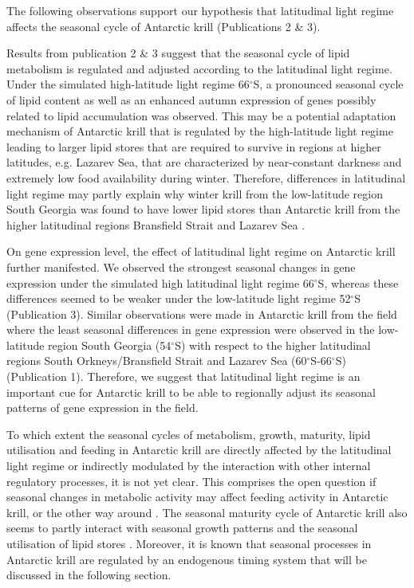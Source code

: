 The following observations support our hypothesis that latitudinal light regime
affects the seasonal cycle of Antarctic krill (Publications 2 \& 3). 

Results from publication 2 \& 3 suggest that the seasonal cycle of lipid
metabolism is regulated and adjusted according to the latitudinal light regime.
Under the simulated high-latitude light regime 66$^{\circ}$S, a pronounced
seasonal cycle of lipid content as well as an enhanced autumn expression of
genes possibly related to lipid accumulation was observed. This may be a
potential adaptation mechanism of Antarctic krill that is regulated by the
high-latitude light regime leading to larger lipid stores that are required to
survive in regions at higher latitudes, e.g. Lazarev Sea, that are
characterized by near-constant darkness and extremely low food availability
during winter.  Therefore, differences in latitudinal light regime may partly
explain why winter krill from the low-latitude region South Georgia was found
to have lower lipid stores than Antarctic krill from the higher latitudinal
regions Bransfield Strait and Lazarev Sea \citep{schmidt_feeding_2014}.

On gene expression level, the effect of latitudinal light regime on Antarctic
krill further manifested. We observed the strongest seasonal changes in gene
expression under the simulated high latitudinal light regime 66$^{\circ}$S,
whereas these differences seemed to be weaker under the low-latitude light
regime 52$^{\circ}$S (Publication 3). Similar observations were made in
Antarctic krill from the field where the least seasonal differences in gene
expression were observed in the low-latitude region South Georgia
(54$^{\circ}$S) with respect to the higher latitudinal regions South
Orkneys/Bransfield Strait and Lazarev Sea (60$^{\circ}$S-66$^{\circ}$S)
(Publication 1). Therefore, we suggest that latitudinal light regime is an
important cue for Antarctic krill to be able to regionally adjust its seasonal
patterns of gene expression in the field.

To which extent the seasonal cycles of metabolism, growth, maturity, lipid
utilisation and feeding in Antarctic krill are directly affected by the
latitudinal light regime or indirectly modulated by the interaction with other
internal regulatory processes, it is not yet clear. This comprises the open
question if seasonal changes in metabolic activity may affect feeding activity
in Antarctic krill, or the other way around \citep{teschke_simulated_2007}. The
seasonal maturity cycle of Antarctic krill also seems to partly interact with
seasonal growth patterns \citep{tarling_growth_2016, thomas_thelycum_1987} and
the seasonal utilisation of lipid stores \citep{teschke_effects_2008}.
Moreover, it is known that seasonal processes in Antarctic krill are regulated
by an endogenous timing system that will be discussed in the following section.


